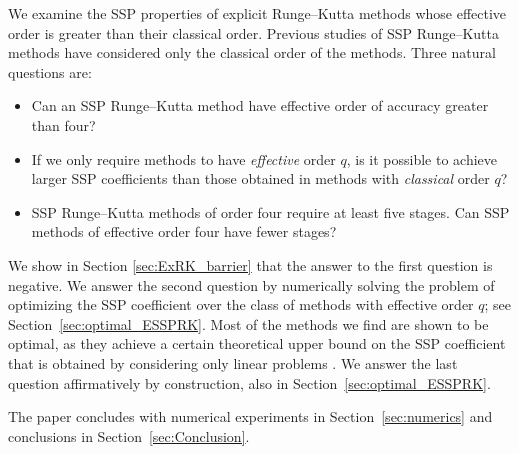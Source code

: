 We examine the SSP properties of explicit Runge--Kutta methods whose
effective order is greater than their classical order.
Previous studies of SSP Runge--Kutta methods have considered only the
classical order of the methods.
Three natural questions are:
\begin{itemize}
    \item Can an SSP Runge--Kutta method have effective order of accuracy greater than four?
    \item If we only require methods to have {\em effective} order $q$, is it possible to achieve larger
            SSP coefficients than those obtained in methods with {\em classical} order $q$?
    \item SSP Runge--Kutta methods of order four require at least five stages.  Can SSP methods of 
          effective order four have fewer stages?
          
\end{itemize}
We show in Section \ref{sec:ExRK_barrier} that the answer to the first question is negative.
We answer the second question by numerically solving the problem of optimizing
the SSP coefficient over the class of methods with effective order $q$;
see Section~\ref{sec:optimal_ESSPRK}.  
Most of the methods we find are shown to be optimal, as they achieve a certain theoretical
upper bound on the SSP coefficient that is obtained by considering only
linear problems \cite{Kraaijevanger1986}.
We answer the last question affirmatively
by construction, also in Section~\ref{sec:optimal_ESSPRK}.

The paper concludes with numerical experiments in
Section~\ref{sec:numerics} and conclusions in
Section~\ref{sec:Conclusion}.
